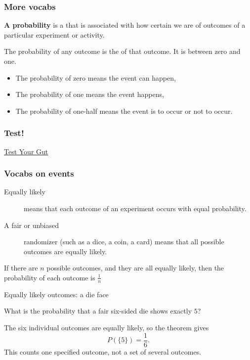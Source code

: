 \begin{frame}
\frametitle{More vocabs}
\begin{block}{}
\textbf{A probability} is a  that is associated with how certain we are of outcomes of a particular experiment or activity.
\end{block}

\begin{block}{}
The probability of any outcome is the  of that outcome. It is between zero and one.
\begin{itemize}
\item The probability of zero means the event can  happen,
\item The probability of one means the event  happens,
\item The probability of one-half means the event is  to occur or not to occur.
\end{itemize}
\end{block}
\end{frame}

\begin{frame}
\end{frame}

\begin{frame}
\frametitle{Test!}
\begin{center}
{\Huge \href{https://www.menti.com/sn8imsvvw2}{Test Your Gut}}
\end{center}
\end{frame}

\begin{frame}
\frametitle{Vocabs on events}
\begin{block}{}
\begin{description}
\item[Equally likely] means that each outcome of an experiment occurs with equal probability.
\item[A fair or unbiased] randomizer (such as a dice, a coin, a card) means that all possible outcomes are equally likely.
\end{description}
\end{block}

\begin{thm}{}{}
If there are $n$ possible outcomes, and they are all equally likely, then the probability of each outcome is $\frac{1}{n}$
\end{thm}
\end{frame}
\begin{frame}[t]{Equally likely outcomes: a die face}
\small
\begin{ex}
What is the probability that a fair six-sided die shows exactly $5$?
\end{ex}
\begin{sol}
The six individual outcomes are equally likely, so the theorem gives\[P(\{5\})=\frac16.\] This counts one specified outcome, not a set of several outcomes.
\end{sol}
\end{frame}

